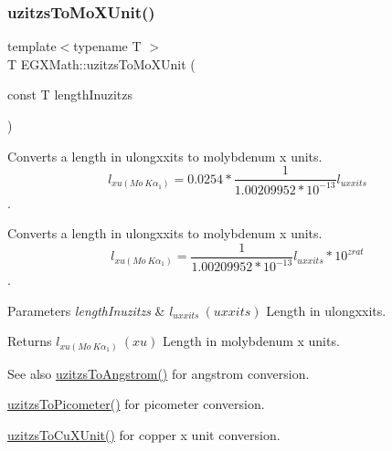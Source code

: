 \subsubsection{\texorpdfstring{uzitzs\+To\+Mo\+X\+Unit()}{uzitzsToMoXUnit()}}
{\footnotesize\ttfamily template$<$typename T $>$ \\
T E\+G\+X\+Math\+::uzitzs\+To\+Mo\+X\+Unit (\begin{DoxyParamCaption}\item[{const T}]{length\+Inuzitzs }\end{DoxyParamCaption})}



Converts a length in ulongxxits to molybdenum x units. \[ l_{xu(Mo\ K\alpha_1)}=0.0254 * \frac{1}{1.00209952*10^{-13}} l_{uxxits}\]. 

Converts a length in ulongxxits to molybdenum x units. \[ l_{xu(Mo\ K\alpha_1)}=\frac{1}{1.00209952*10^{-13}} l_{uxxits} * 10^{zrat}\].


\begin{DoxyParams}{Parameters}
{\em length\+Inuzitzs} & $ l_{uxxits}\ (uxxits)$ Length in ulongxxits. \\
\hline
\end{DoxyParams}
\begin{DoxyReturn}{Returns}
$ l_{xu(Mo\ K\alpha_1)}\ (xu)$ Length in molybdenum x units. 
\end{DoxyReturn}
\begin{DoxySeeAlso}{See also}
\mbox{\hyperlink{group___e_g_x_math-_conversions-_length_conversions-_imperial-uzitzs-_non-_s_i_gaaaecee65b1db5abcc71e18526e7073eb}{uzitzs\+To\+Angstrom()}} for angstrom conversion. 

\mbox{\hyperlink{group___e_g_x_math-_conversions-_length_conversions-_imperial-uzitzs-_s_i_ga48c60a4876ac426d1717096263648a4d}{uzitzs\+To\+Picometer()}} for picometer conversion. 

\mbox{\hyperlink{group___e_g_x_math-_conversions-_length_conversions-_imperial-uzitzs-_non-_s_i_gab25470e41b88c41d4bf32622baa6c472}{uzitzs\+To\+Cu\+X\+Unit()}} for copper x unit conversion. 
\end{DoxySeeAlso}
